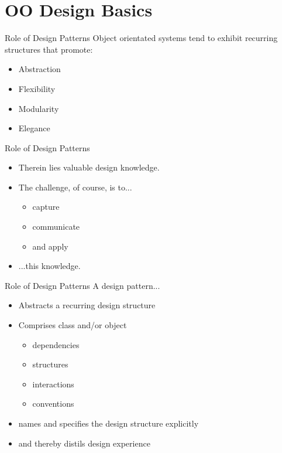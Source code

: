 \part{OO Design Basics}
\frame{\partpage}

\begin{frame}{Role of Design Patterns}
Object orientated systems tend to exhibit recurring structures that promote:
	\begin{itemize}
		\item Abstraction
		\item Flexibility
		\item Modularity
		\item Elegance
	\end{itemize}
\end{frame}

\begin{frame}{Role of Design Patterns}
	\begin{itemize}
		\item Therein lies valuable design knowledge.
		\item The challenge, of course, is to...		
		\begin{itemize}
			\item capture
			\item communicate
			\item and apply
		\end{itemize}
		\item ...this knowledge.
	\end{itemize}
\end{frame}

\begin{frame}{Role of Design Patterns}
A design pattern...

	\begin{itemize}
		\item Abstracts a recurring design structure
		\item Comprises class and/or object	
		\begin{itemize}
			\item dependencies
			\item structures
			\item interactions
			\item conventions
		\end{itemize}
		\item names and specifies the design structure explicitly
		\item and thereby distils design experience
	\end{itemize}
\end{frame}


